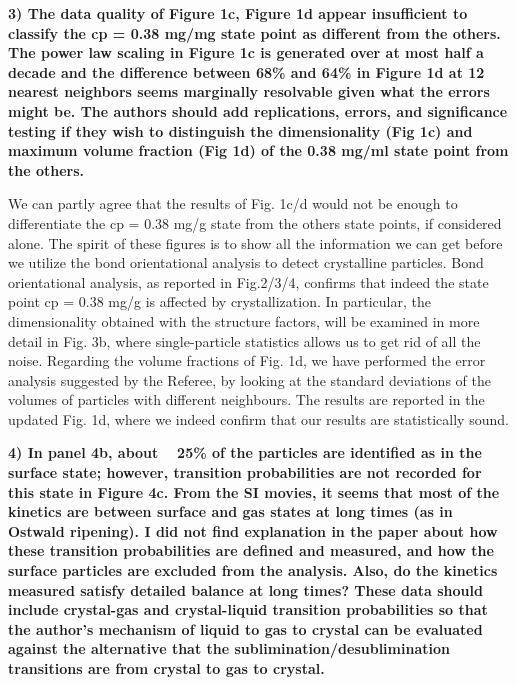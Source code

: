 \documentclass[11pt]{article}
\begin{document}
\vspace{1em}

\singlespacing

{\bf
3) The data quality of Figure 1c, Figure 1d appear insufficient to classify the cp = 0.38 mg/mg state point as different from the others. The power law scaling in Figure 1c is generated over at most half a decade and the difference between 68\% and 64\% in Figure 1d at 12 nearest neighbors seems marginally resolvable given what the errors might be. The authors should add replications, errors, and significance testing if they wish to distinguish the dimensionality (Fig 1c) and maximum volume fraction (Fig 1d) of the 0.38 mg/ml state point from the others.
}



\bigskip
\doublespacing

We can partly agree that the results of Fig. 1c/d would not be enough to differentiate the  cp = 0.38 mg/g state from the others
state points, if considered alone. The spirit of these figures is to show all the information we can get before we utilize the bond orientational
analysis to detect crystalline particles. Bond orientational analysis, as reported in Fig.2/3/4, confirms
that indeed the state point cp = 0.38 mg/g is affected by crystallization. In particular, the dimensionality obtained
with the structure factors, will be examined in more detail in Fig. 3b, where single-particle statistics allows us to
get rid of all the noise.
Regarding the volume fractions of Fig. 1d, we have performed the error analysis suggested by the Referee, by looking at the
standard deviations of the volumes of particles with different neighbours. The results are reported in the updated Fig. 1d,
where we indeed confirm that our results are statistically sound.



\vspace{1em}

\singlespacing

{\bf
4) In panel 4b, about ~ 25\% of the particles are identified as in the surface state; however, transition probabilities are not recorded for this state in Figure 4c. From the SI movies, it seems that most of the kinetics are between surface and gas states at long times (as in Ostwald ripening). I did not find explanation in the paper about how these transition probabilities are defined and measured, and how the surface particles are excluded from the analysis. Also, do the kinetics measured satisfy detailed balance at long times? These data should include crystal-gas and crystal-liquid transition probabilities so that the author's mechanism of liquid to gas to crystal can be evaluated against the alternative that the sublimination/desublimination transitions are from crystal to gas to crystal.
}
\end{document}
